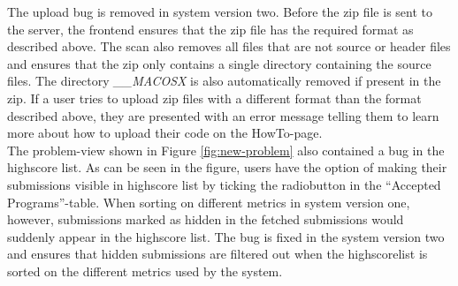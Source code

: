The upload bug is removed in system version two. Before the zip file is sent to the server, the frontend ensures that the zip file has the required format as described above. The scan also removes all files that are not source or header files and ensures that the zip only contains a single directory containing the source files. The directory \textit{\_\_MACOSX} is also automatically removed if present in the zip. If a user tries to upload zip files with a different format than the format described above, they are presented with an error message telling them to learn more about how to upload their code on the HowTo-page. \\

The problem-view shown in Figure \ref{fig:new-problem} also contained a bug in the highscore list. As can be seen in the figure, users have the option of making their submissions visible in highscore list by ticking the radiobutton in the ``Accepted Programs''-table. When sorting on different metrics in system version one, however, submissions marked as hidden in the fetched submissions would suddenly appear in the highscore list. The bug is fixed in the system version two and ensures that hidden submissions are filtered out when the highscorelist is sorted on the different metrics used by the system.

